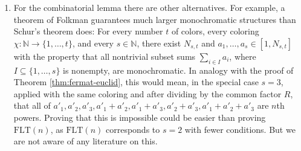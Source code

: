 \documentclass[12pt]{article}
\theoremstyle{theorem}
\theoremstyle{definition}
\newcommand{\N}{\mathbb N}
\newcommand{\FLT}{\mathrm{FLT}}
\begin{document}
\begin{enumerate}
\item{\label{Folkman}} For the combinatorial lemma there are other alternatives.
For example, a theorem of Folkman  \cite[p.~81]{Graham-Rothschild-Spencer} 
guarantees much larger monochromatic
structures than Schur's theorem does: 
For every number $t$ of colors, every
coloring $\chi: \N \rightarrow \{1, \ldots , t\}$, and every $s\in \N$, 
there exist $N_{s,t}$ and $a_1, \ldots , a_s \in [1,N_{s,t}]$
with the property that all nontrivial subset sums 
$\sum_{i \in I} a_i$, where $I\subseteq \{1, \ldots , s\}$ is nonempty,
are monochromatic.
In analogy with the proof of Theorem \ref{thm:fermat-euclid},
this would mean, in the special case $s=3$, applied with the same coloring 
and after dividing by the common factor $R$, that all of
$a'_1,a'_2,a'_3, a'_1+a'_2,a'_1+a'_3,a'_2+a'_3,a'_1+a'_2+a'_3$ are $n$th
powers. 
Proving that this is impossible could be easier than proving $\FLT(n)$,
as $\FLT(n)$ corresponds to $s=2$ with fewer conditions. But we are not
aware of any literature on this.

\end{enumerate}
\end{document}

